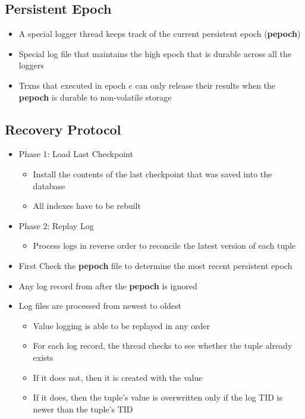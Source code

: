 \documentclass[11pt]{article}
\begin{document}
    \subsection*{Persistent Epoch}
    \begin{itemize}
        \item A special logger thread keeps track of the current persistent epoch (\textbf{pepoch})
        \item Special log file that maintains the high epoch that is durable across all the loggers
        \item Trxns that executed in epoch \textbf{$e$} can only release their results when the \textbf{pepoch} is durable to non-volatile storage
    \end{itemize}

    \subsection*{Recovery Protocol}
    \begin{itemize}
        \item Phase 1: Load Last Checkpoint
        \begin{itemize}
            \item Install the contents of the last checkpoint that was saved into the database
            \item All indexes have to be rebuilt
        \end{itemize}
        \item Phase 2: Replay Log
        \begin{itemize}
            \item Process logs in reverse order to reconcile the latest version of each tuple
        \end{itemize}
        \item First Check the \textbf{pepoch} file to determine the most recent persistent epoch
        \item Any log record from after the \textbf{pepoch} is ignored
        \item Log files are processed from newest to oldest
        \begin{itemize}
            \item Value logging is able to be replayed in any order
            \item For each log record, the thread checks to see whether the tuple already exists
            \item If it does not, then it is created with the value
            \item If it does, then the tuple's value is overwritten only if the log TID is newer than the tuple's TID
        \end{itemize}
    \end{itemize}
\end{document}
